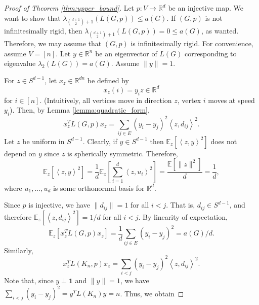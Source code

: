 \documentclass[a4paper,11pt]{article}
\theoremstyle{plain}
\theoremstyle{definition}
\newcommand{\Rea}{{\mathbb R}}
\begin{document}
\begin{proof}[Proof of Theorem \ref{thm:upper_bound}]

Let $p:V\to \Rea^d$ be an injective map.  We want to show that $\lambda_{\binom{d+1}{2}+1}(L(G,p))\leq a(G)$.
If $(G,p)$ is not infinitesimally rigid, then $\lambda_{\binom{d+1}{2}+1}(L(G,p))=0\leq a(G)$, as wanted. Therefore, we may assume that $(G,p)$ is infinitesimally rigid. For convenience, assume $V=[n]$. Let $y\in \Rea^n$ be an eigenvector of $L(G)$ corresponding to eigenvalue $\lambda_2(L(G))=a(G)$. Assume $\|y\|=1$.

For $z\in S^{d-1}$, let $x_z\in \Rea^{dn}$ be defined by
\[
    x_z(i)= y_i z\in \Rea^d
\]
for $i\in[n]$. (Intuitively, all vertices move in direction $z$, vertex $i$ moves at speed $y_i$). Then, by Lemma \ref{lemma:quadratic_form},
\[
    x_z^T L(G,p) x_z= \sum_{ij\in E} (y_i-y_j)^2 \left\langle z,d_{ij}\right\rangle^2.
\]
Let $z$ be uniform in $S^{d-1}$. Clearly, if $y\in S^{d-1}$ then $\mathbb{E}_z[\left\langle z,y\right\rangle^2]$ does not depend on $y$ since $z$ is spherically symmetric. Therefore,
\[
\mathbb{E}_z[\left\langle z,y\right\rangle^2] = \frac{1}{d} \mathbb{E}_z \left[\sum_{i=1}^{d}\left\langle z,u_i\right\rangle^2\right] = \frac {\mathbb E[\|z\|^2]}d = \frac 1d,
\]
where $u_1,...,u_d$ is some orthonormal basis for $\Rea^d.$

Since $p$ is injective, we have $\|d_{ij}\|=1$ for all $i<j$. That is, $d_{ij}\in S^{d-1}$, and therefore $\mathbb{E}_z[\left\langle z,d_{ij}\right\rangle^2]=1/d$ for all $i<j$. By linearity of expectation, 
\[
\mathbb{E}_z[x_z^T L(G,p) x_z]=\frac 1d \sum_{ij\in E} (y_i-y_j)^2 = a(G)/d.
\]
Similarly,
\[
    x_z^T L(K_n,p) x_z= \sum_{i<j} (y_i-y_j)^2 \left\langle z,d_{ij}\right\rangle^2.
\]
Note that, since $y\perp \textbf{1}$ and $\|y\|=1$, 
we have $\sum_{i<j} (y_i-y_j)^2 = y^T L(K_n)y  = n$. Thus, we obtain


\end{proof}
\end{document}
